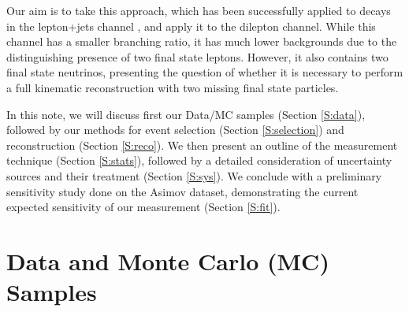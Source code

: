 Our aim is to take this approach, which has been successfully applied to \ttbar decays in the lepton+jets channel \cite{ytpaper}, and apply it to the dilepton channel. While this channel has a smaller branching ratio, it has much lower backgrounds due to the distinguishing presence of two final state leptons. However, it also contains two final state neutrinos, presenting the question of whether it is necessary to perform a full kinematic reconstruction with two missing final state particles. 

In this note, we will discuss first our Data/MC samples (Section \ref{S:data}), followed by our methods for event selection (Section \ref{S:selection}) and reconstruction (Section \ref{S:reco}). We then present an outline of the measurement technique (Section \ref{S:stats}), followed by a detailed consideration of uncertainty sources and their treatment (Section \ref{S:sys}). We conclude with a preliminary sensitivity study done on the Asimov dataset, demonstrating the current expected sensitivity of our measurement (Section \ref{S:fit}).

\clearpage
\section{Data and Monte Carlo (MC) Samples}

